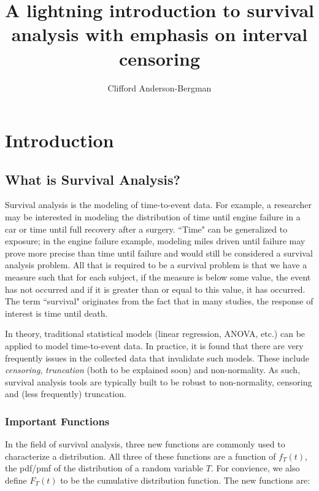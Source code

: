 \documentclass[a4paper]{article}
\begin{document}


\title{A lightning introduction to survival analysis with emphasis on interval censoring}
\author{Clifford Anderson-Bergman}
\maketitle


\tableofcontents

\section{Introduction}

\subsection{What is Survival Analysis?}

  Survival analysis is the modeling of time-to-event data. For example, a researcher may be interested in modeling the distribution of time until engine failure in a car or time until full recovery after a surgery. ``Time" can be generalized to exposure; in the engine failure example, modeling miles driven until failure may prove more precise than time until failure and would still be considered a survival analysis problem. All that is required to be a survival problem is that we have a measure such that for each subject, if the measure is below some value, the event has not occurred and if it is greater than or equal to this value, it has occurred. The term ``survival" originates from the fact that in many studies, the response of interest is time until death. 
  
  In theory, traditional statistical models (linear regression, ANOVA, etc.) can be applied to model time-to-event data. In practice, it is found that there are very frequently issues in the collected data that invalidate such models. These include \emph{censoring}, \emph{truncation} (both to be explained soon) and non-normality. As such, survival analysis tools are typically built to be robust to non-normality, censoring and (less frequently) truncation. 
  

\subsubsection{Important Functions}

  In the field of survival analysis, three new functions are commonly used to characterize a distribution. All three of these functions are a function of $f_T(t)$, the pdf/pmf of the distribution of a random variable $T$. For convience, we also define $F_T(t)$ to be the cumulative distribution function. The new functions are:
  
\end{document}

